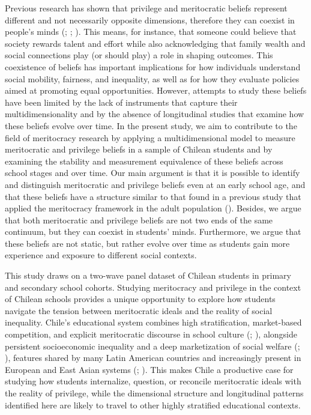 \documentclass[
  13pt,
]{article}
\begin{document}
Previous research has shown that privilege and meritocratic beliefs
represent different and not necessarily opposite dimensions, therefore
they can coexist in people's minds
(;
;
). This means,
for instance, that someone could believe that society rewards talent and
effort while also acknowledging that family wealth and social
connections play (or should play) a role in shaping outcomes. This
coexistence of beliefs has important implications for how individuals
understand social mobility, fairness, and inequality, as well as for how
they evaluate policies aimed at promoting equal opportunities. However,
attempts to study these beliefs have been limited by the lack of
instruments that capture their multidimensionality and by the absence of
longitudinal studies that examine how these beliefs evolve over time. In
the present study, we aim to contribute to the field of meritocracy
research by applying a multidimensional model to measure meritocratic
and privilege beliefs in a sample of Chilean students and by examining
the stability and measurement equivalence of these beliefs across school
stages and over time. Our main argument is that it is possible to
identify and distinguish meritocratic and privilege beliefs even at an
early school age, and that these beliefs have a structure similar to
that found in a previous study that applied the meritocracy framework in
the adult population
().
Besides, we argue that both meritocratic and privilege beliefs are not
two ends of the same continuum, but they can coexist in students' minds.
Furthermore, we argue that these beliefs are not static, but rather
evolve over time as students gain more experience and exposure to
different social contexts.

This study draws on a two-wave panel dataset of Chilean students in
primary and secondary school cohorts. Studying meritocracy and privilege
in the context of Chilean schools provides a unique opportunity to
explore how students navigate the tension between meritocratic ideals
and the reality of social inequality. Chile's educational system
combines high stratification, market-based competition, and explicit
meritocratic discourse in school culture
(;
),
alongside persistent socioeconomic inequality and a deep marketization
of social welfare (;
), features shared
by many Latin American countries and increasingly present in European
and East Asian systems (; ). This makes
Chile a productive case for studying how students internalize, question,
or reconcile meritocratic ideals with the reality of privilege, while
the dimensional structure and longitudinal patterns identified here are
likely to travel to other highly stratified educational contexts.
\end{document}
